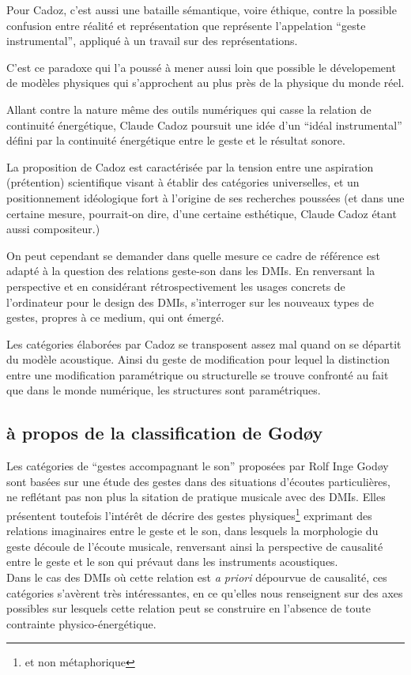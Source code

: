 Pour Cadoz, c'est aussi une bataille sémantique, voire éthique, contre la possible confusion entre réalité et représentation que représente l'appelation ``geste instrumental'', appliqué à un travail sur des représentations.

C'est ce paradoxe qui l'a poussé à mener aussi loin que possible le dévelopement de modèles physiques qui s'approchent au plus près de la physique du monde réel.

Allant contre la nature même des outils numériques qui casse la relation de continuité énergétique, Claude Cadoz poursuit une idée d'un ``idéal instrumental'' défini par la continuité énergétique entre le geste et le résultat sonore.

La proposition de Cadoz est caractérisée par la tension entre une aspiration (prétention) scientifique visant à établir des catégories universelles, et un positionnement idéologique fort à l'origine de ses recherches poussées (et dans une certaine mesure, pourrait-on dire, d'une certaine esthétique, Claude Cadoz étant aussi compositeur.)


On peut cependant se demander dans quelle mesure ce cadre de référence est adapté à la question des relations geste-son dans les \glspl{DMI}. En renversant la perspective et en considérant rétrospectivement les usages concrets de l'ordinateur pour le design des \glspl{DMI}, s'interroger sur les nouveaux types de gestes, propres à ce medium, qui ont émergé.

Les catégories élaborées par Cadoz se transposent assez mal quand on se départit du modèle acoustique. Ainsi du geste de modification pour lequel la distinction entre une modification paramétrique ou structurelle se trouve confronté au fait que dans le monde numérique, les structures sont paramétriques.


\subsection{à propos de la classification de Godøy}
Les catégories de ``gestes accompagnant le son'' proposées par Rolf Inge Godøy sont basées sur une étude des gestes dans des situations d'écoutes particulières, ne reflétant pas non plus la sitation de pratique musicale avec des \glspl{DMI}. Elles présentent toutefois l'intérêt de décrire des gestes physiques\footnote{et non métaphorique} exprimant des relations imaginaires entre le geste et le son, dans lesquels la morphologie du geste découle de l'écoute musicale, renversant ainsi la perspective de causalité entre le geste et le son qui prévaut dans les instruments acoustiques.\\
\indent Dans le cas des \glspl{DMI} où cette relation est \textit{a priori} dépourvue de causalité, ces catégories s'avèrent très intéressantes, en ce qu'elles nous renseignent sur des axes possibles sur lesquels cette relation peut se construire en l'absence de toute contrainte physico-énergétique.

